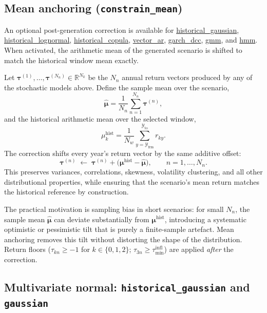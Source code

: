 \documentclass[fleqn,12pt]{report}
\newcommand{\code}[1]{\url{#1}}
\begin{document}
\subsection{Mean anchoring (\texttt{constrain\_mean})}
\label{sec:constrain-mean}

An optional post-generation correction is available for
\code{historical_gaussian}, \code{historical_lognormal},
\code{historical_copula}, \code{vector_ar}, \code{garch_dcc}, \code{gmm}, and \code{hmm}.
When activated, the arithmetic mean of the generated scenario is shifted
to match the historical window mean exactly.

Let $\bm{\tau}^{(1)}, \ldots, \bm{\tau}^{(N_n)} \in \mathbb{R}^{N_k}$
be the $N_n$ annual return vectors produced by any of the stochastic models
above.
Define the sample mean over the scenario,
\begin{equation}
    \hat{\bm{\mu}} = \frac{1}{N_n}\sum_{n=1}^{N_n} \bm{\tau}^{(n)},
\end{equation}
and the historical arithmetic mean over the selected window,
\begin{equation}
    \mu_k^{\mathrm{hist}} = \frac{1}{N_w}
        \sum_{y=\mathcal{Y}_{\mathrm{frm}}}^{\mathcal{Y}_{\mathrm{to}}} r_{ky}.
\end{equation}
The correction shifts every year's return vector by the same additive offset:
\begin{equation}
    \bm{\tau}^{(n)} \;\leftarrow\; \bm{\tau}^{(n)}
        + \bigl(\bm{\mu}^{\mathrm{hist}} - \hat{\bm{\mu}}\bigr),
    \qquad n = 1, \ldots, N_n.
\end{equation}
This preserves variances, correlations, skewness, volatility clustering, and
all other distributional properties, while ensuring that the scenario's mean
return matches the historical reference by construction.

The practical motivation is sampling bias in short scenarios: for small $N_n$,
the sample mean $\hat{\bm{\mu}}$ can deviate substantially from
$\bm{\mu}^{\mathrm{hist}}$, introducing a systematic optimistic or pessimistic
tilt that is purely a finite-sample artefact.
Mean anchoring removes this tilt without distorting the shape of the
distribution.
Return floors ($\tau_{kn} \ge -1$ for $k \in \{0,1,2\}$;
$\tau_{3n} \ge \tau_{\min}^{\mathrm{infl}}$) are applied \emph{after} the
correction.

\subsection{Multivariate normal: \texttt{historical\_gaussian} and \texttt{gaussian}}
\end{document}
